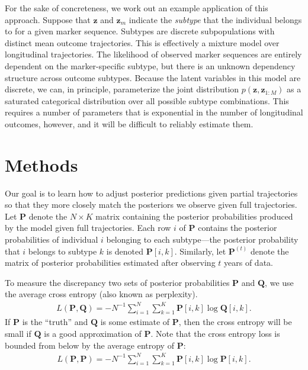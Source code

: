 \documentclass[12pt]{article}
\newcommand{\I}{{-1}}
\newcommand{\psup}[1]{^{(#1)}}
\begin{document}
For the sake of concreteness, we work out an example application of this approach. Suppose that $\bm{z}$ and $\bm{z}_m$ indicate the \emph{subtype} that the individual belongs to for a given marker sequence. Subtypes are discrete subpopulations with distinct mean outcome trajectories. This is effectively a mixture model over longitudinal trajectories. The likelihood of observed marker sequences are entirely dependent on the marker-specific subtype, but there is an unknown dependency structure across outcome subtypes. Because the latent variables in this model are discrete, we can, in principle, parameterize the joint distribution $p(\bm{z}, \bm{z}_{1:M})$ as a saturated categorical distribution over all possible subtype combinations. This requires a number of parameters that is exponential in the number of longitudinal outcomes, however, and it will be difficult to reliably estimate them.

\section{Methods}

Our goal is to learn how to adjust posterior predictions given partial trajectories so that they more closely match the posteriors we observe given full trajectories. Let $\bm{P}$ denote the $N \times K$ matrix containing the posterior probabilities produced by the model given full trajectories. Each row $i$ of $\bm{P}$ contains the posterior probabilities of individual $i$ belonging to each subtype---the posterior probability that $i$ belongs to subtype $k$ is denoted $\bm{P}[i,k]$. Similarly, let $\bm{P}\psup{t}$ denote the matrix of posterior probabilities estimated after observing $t$ years of data.

To measure the discrepancy two sets of posterior probabilities $\bm{P}$ and $\bm{Q}$, we use the average cross entropy (also known as perplexity).
\begin{align}
L(\bm{P}, \bm{Q}) = - N^\I \sum_{i=1}^N \sum_{k=1}^K \bm{P}[i,k] \log \bm{Q}[i,k].
\end{align}
If $\bm{P}$ is the ``truth'' and $\bm{Q}$ is some estimate of $\bm{P}$, then the cross entropy will be small if $\bm{Q}$ is a good approximation of $\bm{P}$. Note that the cross entropy loss is bounded from below by the average entropy of $\bm{P}$:
\begin{align}
L(\bm{P}, \bm{P}) = - N^\I \sum_{i=1}^N \sum_{k=1}^K \bm{P}[i,k] \log \bm{P}[i,k].
\end{align}
\end{document}
